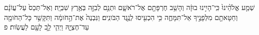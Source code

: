\documentclass{openreader}
\begin{document}
שְׁמַ֤ע אֱלֹהֵ֨ינוּ֙ כִּֽי־הָיִ֣ינוּ בוּזָ֔ה וְהָשֵׁ֥ב חֶרְפָּתָ֖ם אֶל־רֹאשָׁ֑ם וּתְנֵ֥ם לְבִזָּ֖ה בְּאֶ֥רֶץ שִׁבְיָֽה׃ 
וְאַל־תְּכַס֙ עַל־עֲוֹנָ֔ם וְחַטָּאתָ֖ם מִלְּפָנֶ֣יךָ אַל־תִּמָּחֶ֑ה כִּ֥י הִכְעִ֖יסוּ לְנֶ֥גֶד הַבֹּונִֽים׃ 
וַנִּבְנֶה֙ אֶת־הַ֣חֹומָ֔ה וַתִּקָּשֵׁ֥ר כָּל־הַחֹומָ֖ה עַד־חֶצְיָ֑הּ וַיְהִ֧י לֵ֦ב לָעָ֖ם לַעֲשֹֽׂות׃ פ 
\end{document}
